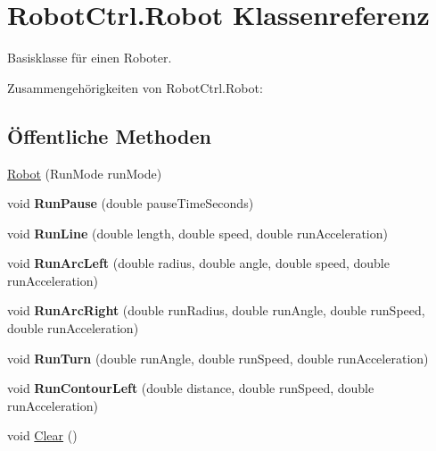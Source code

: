 \hypertarget{class_robot_ctrl_1_1_robot}{
\section{RobotCtrl.Robot Klassenreferenz}
\label{class_robot_ctrl_1_1_robot}
}


Basisklasse f\"{u}r einen Roboter.  




Zusammengehörigkeiten von RobotCtrl.Robot:\subsection*{Öffentliche Methoden}
\begin{DoxyCompactItemize}
\item 
\hyperlink{class_robot_ctrl_1_1_robot_acdd921df41328916b058eaad84ed3078}{Robot} (RunMode runMode)
\item 
\hypertarget{class_robot_ctrl_1_1_robot_a95c4c2d60e88ff9d6827d8d97eee2386}{
void {\bfseries RunPause} (double pauseTimeSeconds)}
\label{class_robot_ctrl_1_1_robot_a95c4c2d60e88ff9d6827d8d97eee2386}

\item 
\hypertarget{class_robot_ctrl_1_1_robot_a6a16f9f310f34fbe408bb7ab51a89a32}{
void {\bfseries RunLine} (double length, double speed, double runAcceleration)}
\label{class_robot_ctrl_1_1_robot_a6a16f9f310f34fbe408bb7ab51a89a32}

\item 
\hypertarget{class_robot_ctrl_1_1_robot_a07b940c45155aae3b6ae5ce7d58a90f1}{
void {\bfseries RunArcLeft} (double radius, double angle, double speed, double runAcceleration)}
\label{class_robot_ctrl_1_1_robot_a07b940c45155aae3b6ae5ce7d58a90f1}

\item 
\hypertarget{class_robot_ctrl_1_1_robot_aaff244d591788ca15722234a71cee2be}{
void {\bfseries RunArcRight} (double runRadius, double runAngle, double runSpeed, double runAcceleration)}
\label{class_robot_ctrl_1_1_robot_aaff244d591788ca15722234a71cee2be}

\item 
\hypertarget{class_robot_ctrl_1_1_robot_ae9c9a939809668a900df594a31e5bba3}{
void {\bfseries RunTurn} (double runAngle, double runSpeed, double runAcceleration)}
\label{class_robot_ctrl_1_1_robot_ae9c9a939809668a900df594a31e5bba3}

\item 
\hypertarget{class_robot_ctrl_1_1_robot_a1fe7604ec3a28152fc34659fdd1f2489}{
void {\bfseries RunContourLeft} (double distance, double runSpeed, double runAcceleration)}
\label{class_robot_ctrl_1_1_robot_a1fe7604ec3a28152fc34659fdd1f2489}

\item 
void \hyperlink{class_robot_ctrl_1_1_robot_afb01a74bfcb74eab60f041a368f93737}{Clear} ()
\end{DoxyCompactItemize}
